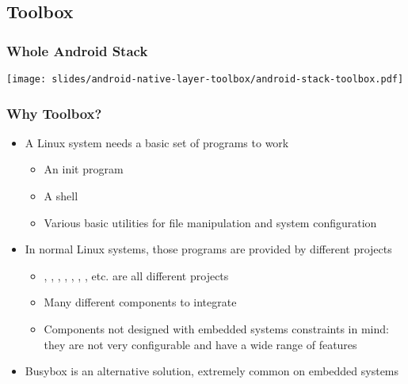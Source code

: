 \subsection{Toolbox}

\begin{frame}
  \frametitle{Whole Android Stack}
  \begin{center}
    \texttt{[image: slides/android-native-layer-toolbox/android-stack-toolbox.pdf]}
  \end{center}
\end{frame}

\begin{frame}
  \frametitle{Why Toolbox?}
  \begin{itemize}
  \item A Linux system needs a basic set of programs to work
    \begin{itemize}
    \item An init program
    \item A shell
    \item Various basic utilities for file manipulation and system
      configuration
    \end{itemize}
  \item In normal Linux systems, those programs are provided by
    different projects
    \begin{itemize}
    \item {}, , , ,
      , , , etc. are all different
      projects
    \item Many different components to integrate
    \item Components not designed with embedded systems constraints in
      mind: they are not very configurable and have a wide range of
      features
    \end{itemize}
  \item Busybox is an alternative solution, extremely common on
    embedded systems
  \end{itemize}
\end{frame}

